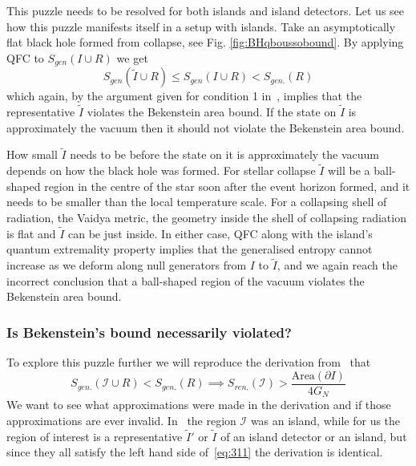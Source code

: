 \documentclass[a4paper,11pt]{article}
\newcommand{\cts}[1]{\ignorespaces}
\def\bne{\begin{equation}}
\def\ene{\end{equation}}
\newcommand{\del}{\partial}
\begin{document}
\cts{Need reference for this statement about the vacuum state?}    



This puzzle needs to be resolved for both islands and island detectors. Let us see how this puzzle manifests itself in a setup with islands. Take an asymptotically flat black hole formed from collapse, see Fig. \ref{fig:BHqboussobound}. By applying QFC to $S_{gen} (I \cup R)$ we get
\bne S_{gen} (\tilde I \cup R) \leq S_{gen} (I \cup R) < S_{gen.} (R) \ene
which again, by the argument given for condition 1 in~\cite{Hartman2020}, implies that the representative $\tilde I$ violates the Bekenstein area bound. If the state on $\tilde I$ is approximately the vacuum then it should not violate the Bekenstein area bound. 

How small $\tilde I$ needs to be before the state on it is approximately the vacuum depends on how the black hole was formed. For stellar collapse $\tilde I$ will be a ball-shaped region in the centre of the star soon after the event horizon formed, and it needs to be smaller than the local temperature scale. For a collapsing shell of radiation, the Vaidya metric, the geometry inside the shell of collapsing radiation is flat and $\tilde I$ can be just inside. In either case, QFC along with the island's quantum extremality property implies that the generalised entropy cannot increase as we deform along null generators from $I$ to $\tilde I$, and we again reach the incorrect conclusion that a ball-shaped region of the vacuum violates the Bekenstein area bound.

\subsubsection{Is Bekenstein's bound necessarily violated?}

To explore this puzzle further we will reproduce the derivation from~\cite{Hartman2020} that
\bne \label{eq:311} S_{gen.} (\mathcal{I} \cup R) < S_{gen.} (R) \implies S_{ren.} (\mathcal{I}) > \frac{\text{Area}(\del I)}{4G_N} \ene
We want to see what approximations were made in the derivation and if those approximations are ever invalid. In~\cite{Hartman2020} the region $\mathcal{I}$ was an island, while for us the region of interest is a representative $\tilde I'$ or $\tilde I$ of an island detector or an island, but since they all satisfy the left hand side of~\eqref{eq:311} the derivation is identical.
\end{document}
